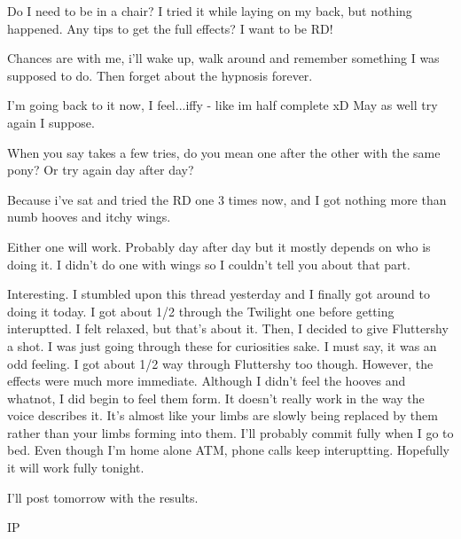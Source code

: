 \documentclass[ebook,12pt,oneside,openany]{memoir}
\newcommand{\mytexttilde}{\raisebox{0.5ex}{\texttildelow}}
\begin{document}
\begin{tcolorbox}[title=SongBrony]
\par{Do I need to be in a chair? I tried it while laying on my back, but nothing happened. Any tips to get the full effects? I want to be RD!}
\end{tcolorbox}
\begin{tcolorbox}[title=Harmonic Revelations,colback=brown!5!white,colframe=brown!75!black,coltitle=white]
\begin{tcolorbox}[title=Creeping Dusk]
\par{Chances are with me, i'll wake up, walk around and remember something I was supposed to do. Then forget about the hypnosis forever. }
\par{I'm going back to it now, I feel...iffy - like im half complete xD May as well try again I suppose.}
\newline{}
\newline{}
\newline{}
\newline{}
\par{When you say takes a few tries, do you mean one after the other with the same pony? Or try again day after day?}
\par{Because i've sat and tried the RD one 3 times now, and I got nothing more than numb hooves and itchy wings.  }
\end{tcolorbox}
\par{Either one will work. Probably day after day but it mostly depends on who is doing it. I didn't do one with wings so I couldn't tell you about that part.}
\end{tcolorbox}
\begin{tcolorbox}[title=IronPuddinG]
\par{Interesting.  I stumbled upon this thread yesterday and I finally got around to doing it today.   I got about 1/2 through the Twilight one before getting interuptted.  I felt relaxed, but that's about it.  Then, I decided to give Fluttershy a shot.  I was just going through these for curiosities sake.  I must say, it was an odd feeling.  I got about 1/2 way through Fluttershy too though.  However, the effects were much more immediate.  Although I didn't feel the hooves and whatnot, I did begin to feel them form.  It doesn't really work in the way the voice describes it.  It's almost like your limbs are slowly being replaced by them rather than your limbs forming into them.  I'll probably commit fully when I go to bed.  Even though I'm home alone ATM, phone calls keep interuptting.  Hopefully it will work fully tonight.}
\par{I'll post tomorrow with the results.}
\par{\mytexttilde{}IP}
\end{tcolorbox}
\end{document}
